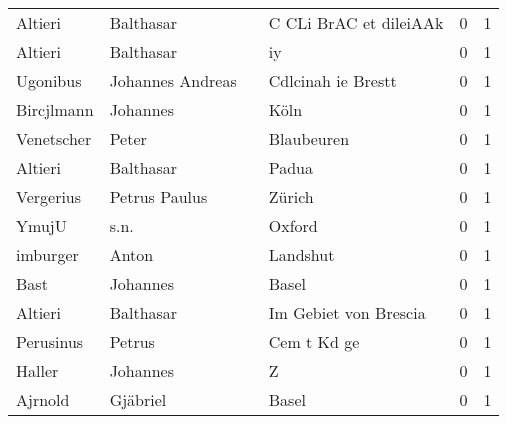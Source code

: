 \begin{center}
\begin{tiny}
\begin{longtabu}{llllrr}
                  Altieri &                          Balthasar &             &                      C CLi BrAC et dileiAAk &          0 &         1 \\
                  Altieri &                          Balthasar &             &                                          iy &          0 &         1 \\
                 Ugonibus &                   Johannes Andreas &             &                          Cdlcinah ie Brestt &          0 &         1 \\
               Bircjlmann &                           Johannes &             &                                        Köln &          0 &         1 \\
               Venetscher &                              Peter &             &                                  Blaubeuren &          0 &         1 \\
                  Altieri &                          Balthasar &             &                                       Padua &          0 &         1 \\
                Vergerius &                      Petrus Paulus &             &                                      Zürich &          0 &         1 \\
                    YmujU &                               s.n. &             &                                      Oxford &          0 &         1 \\
                 imburger &                              Anton &             &                                    Landshut &          0 &         1 \\
                     Bast &                           Johannes &             &                                       Basel &          0 &         1 \\
                  Altieri &                          Balthasar &             &                       Im Gebiet von Brescia &          0 &         1 \\
                Perusinus &                             Petrus &             &                                 Cem t Kd ge &          0 &         1 \\
                   Haller &                           Johannes &             &                                           Z &          0 &         1 \\
                  Ajrnold &                           Gjäbriel &             &                                       Basel &          0 &         1 \\

\end{longtabu}
\end{tiny}
\end{center}
